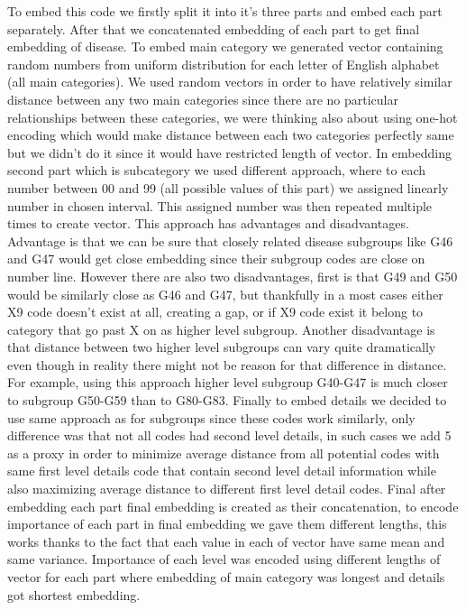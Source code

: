 To embed this code we firstly split it into it's three parts and embed each part separately. After that we concatenated embedding of each part to get final embedding of disease.
To embed main category we generated vector containing random numbers from uniform distribution for each letter of English alphabet (all main categories). We used random vectors in order to have relatively similar distance between any two main categories since there are no particular relationships between these categories, we were thinking also about using one-hot encoding which would make distance between each two categories perfectly same but we didn't do it since it would have restricted length of vector. 
In embedding second part which is subcategory we used different approach, where to each number between 00 and 99 (all possible values of this part) we assigned linearly number in chosen interval. This assigned number was then repeated multiple times to create vector. This approach has advantages and disadvantages. Advantage is that we can be sure that closely related disease subgroups like G46 and G47 would get close embedding since their subgroup codes are close on number line. However there are also two disadvantages, first is that G49 and G50 would be similarly close as G46 and G47, but thankfully in a most cases either X9 code doesn't exist at all, creating a gap, or if X9 code exist it belong to category that go past X on as higher level subgroup. Another disadvantage is that distance between two higher level subgroups can vary quite dramatically even though in reality there might not be reason for that difference in distance. For example, using this approach higher level subgroup G40-G47 is much closer to subgroup G50-G59 than to G80-G83.
Finally to embed details we decided to use same approach as for subgroups since these codes work similarly, only difference was that not all codes had second level details, in such cases we add 5 as a proxy in order to minimize average distance from all potential codes with same first level details code that contain second level detail information while also maximizing average distance to different first level detail codes.
Final after embedding each part final embedding is created as their concatenation, to encode importance of each part in final embedding we gave them different lengths, this works thanks to the fact that each value in each of vector have same mean and same variance. 
Importance of each level was encoded using different lengths of vector for each part where embedding of main category was longest and details got shortest embedding.

